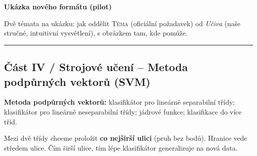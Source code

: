 \documentclass[11pt,a4paper]{article}
\newcommand{\ucivo}{\par\vspace{1pt}\noindent{\footnotesize\itshape\color{intugreen!60!black}Učivo (jak na to):}\par\nopagebreak\vspace{1pt}}
\begin{document}
{\large\bfseries\color{mffblue} Ukázka nového formátu (pilot)}\par
\vspace{2pt}
{\small Dvě témata na ukázku: jak oddělit \textsc{Téma} (oficiální požadavek) od \emph{Učiva} (naše stručné, intuitivní vysvětlení), s obrázkem tam, kde pomůže.}\par
\vspace{6pt}\hrule\vspace{10pt}

\subsection*{Část IV / Strojové učení -- Metoda podpůrných vektorů (SVM)}
\par\smallskip

\begin{tema}
\textbf{Metoda podpůrných vektorů:} klasifikátor pro lineárně separabilní třídy;
klasifikátor pro lineárně neseparabilní třídy; jádrové funkce; klasifikace do více tříd.
\end{tema}

\ucivo
\begin{intuice}
Mezi dvě třídy chceme proložit \textbf{co nejširší ulici} (pruh bez bodů). Hranice
vede středem ulice. Čím širší ulice, tím lépe klasifikátor generalizuje na nová data.
\end{intuice}
\end{document}
